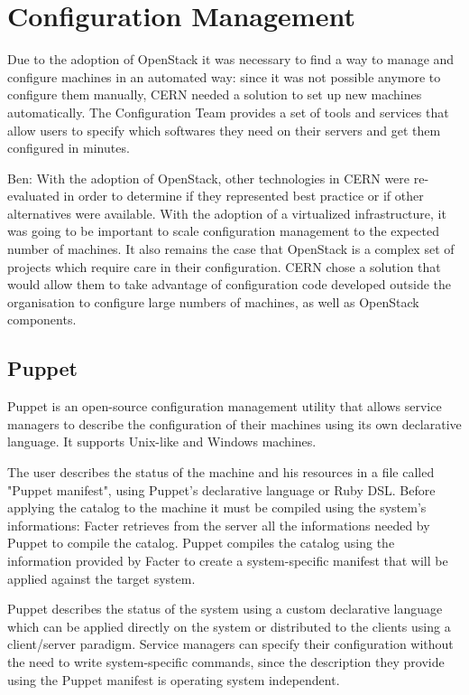 \section{Configuration Management}

Due to the adoption of OpenStack it was necessary to find a way to manage
and configure machines in an automated way: since it was not possible
anymore to configure them manually, CERN needed a solution to set up new
machines automatically. The Configuration Team provides a set of tools and
services that allow users to specify which softwares they need on their
servers and get them configured in minutes.

Ben: With the adoption of OpenStack, other technologies in CERN were 
re-evaluated in order to determine if they represented best practice or
if other alternatives were available. With the adoption of a virtualized
infrastructure, it was going to be important to scale configuration
management to the expected number of machines. It also remains the case
that OpenStack is a complex set of projects which require care in their
configuration. CERN chose a solution that would allow them to take 
advantage of configuration code developed outside the organisation to 
configure large numbers of machines, as well as OpenStack components.

\subsection{Puppet}

Puppet is an open-source configuration management utility that allows
service managers to describe the configuration of their machines using its
own declarative language. It supports Unix-like and Windows machines.

The user describes the status of the machine and his resources in a file
called "Puppet manifest", using Puppet's declarative language or Ruby DSL.
Before applying the catalog to the machine it must be compiled using the
system's informations: Facter retrieves from the server all the
informations needed by Puppet to compile the catalog. Puppet compiles the
catalog using the information provided by Facter to create
a system-specific manifest that will be applied against the target system.

Puppet describes the status of the system using a custom declarative
language which can be applied directly on the system or distributed to the
clients using a client/server paradigm. Service managers can specify their
configuration without the need to write system-specific commands, since
the description they provide using the Puppet manifest is operating system
independent.

